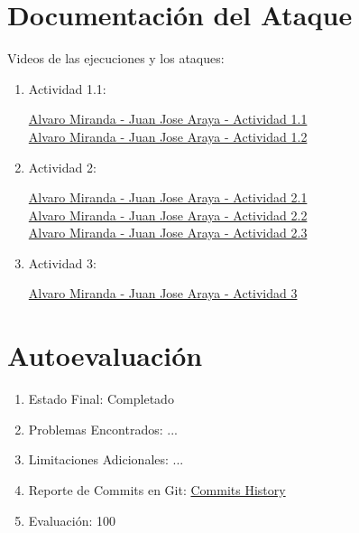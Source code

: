 \documentclass{article}
\begin{document}
\section*{Documentación del Ataque}

Videos de las ejecuciones y los ataques: \\

\begin{enumerate}
  \item Actividad 1.1:

  \href{https://www.loom.com/share/622ec72dc2cb4c658d06e8dee2589afd}{Alvaro Miranda - Juan Jose Araya - Actividad 1.1} \\
  
  \href{https://www.loom.com/share/7ac21ee2b903425195a60f802dd6a9c9}{Alvaro Miranda - Juan Jose Araya - Actividad 1.2} \\
  
  \item Actividad 2:
  
  \href{https://www.loom.com/share/36b82066d6d043168116ed0fc0b293b6}{Alvaro Miranda - Juan Jose Araya - Actividad 2.1} \\
  
  \href{https://www.loom.com/share/6dc3ff3fbb97469085bb2e26dcbf3220}{Alvaro Miranda - Juan Jose Araya - Actividad 2.2} \\
  
  \href{https://www.loom.com/share/466ba0ef96464f9a95a7eb8b19e8fb2f}{Alvaro Miranda - Juan Jose Araya - Actividad 2.3} \\
  
  \item Actividad 3:
  
  \href{https://www.loom.com/share/ae3e916e6bf14555b860367652aa316d}{Alvaro Miranda - Juan Jose Araya - Actividad 3} \\
  
\end{enumerate}



\section*{Autoevaluación}

\begin{enumerate}
    \item Estado Final: Completado
    \item Problemas Encontrados: ...
    \item Limitaciones Adicionales: ...
    \item Reporte de Commits en Git: \href{https://github.com/varitomirandacr/SeguridadSO_RaceCondition/commits/main}{Commits History}
    \item Evaluación: 100%
\end{enumerate}
\end{document}
